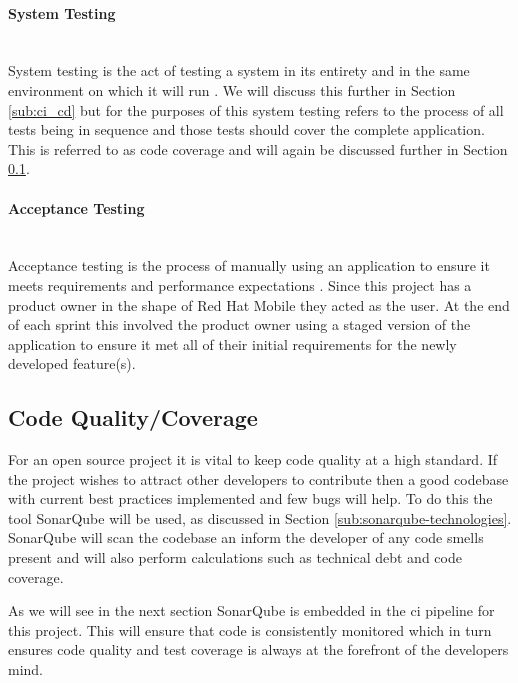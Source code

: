 \paragraph{System Testing}\mbox{}\\
System testing is the act of testing a system in its entirety and in the same environment on which it will run \citep{SystemTesting2017}. We will discuss this further in Section \ref{sub:ci_cd} but for the purposes of this system testing refers to the process of all tests being in sequence and those tests should cover the complete application. This is referred to as \gls{code coverage} and will again be discussed further in Section \ref{sub:code_quality}. 

\paragraph{Acceptance Testing}\mbox{}\\
Acceptance testing is the process of manually using an application to ensure it meets requirements and performance expectations \citep{AcceptanceTesting2017}. Since this project has a product owner in the shape of Red Hat Mobile they acted as the user. At the end of each sprint this involved the product owner using a staged version of the application to ensure it met all of their initial requirements for the newly developed feature(s).

\subsection{Code Quality/Coverage}
\label{sub:code_quality}
For an open source project it is vital to keep code quality at a high standard. If the project wishes to attract other developers to contribute then a good codebase with current best practices implemented and few bugs will help. To do this the tool SonarQube will be used, as discussed in Section \ref{sub:sonarqube-technologies}. SonarQube will scan the codebase an inform the developer of any \gls{code smell}s present and will also perform calculations such as \gls{technical debt} and \gls{code coverage}. 

As we will see in the next section SonarQube is embedded in the \gls{ci} pipeline for this project. This will ensure that code is consistently monitored which in turn ensures code quality and test coverage is always at the forefront of the developers mind.

